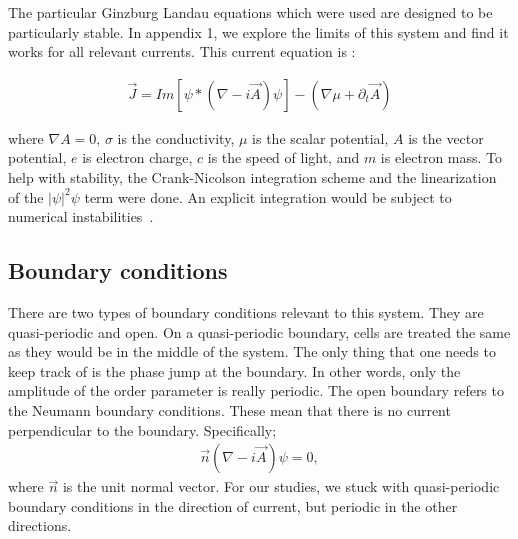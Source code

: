 The particular Ginzburg Landau equations which were used are designed to be particularly stable. In appendix 1, we explore the limits of this system and find it works for all relevant currents. This current equation is :

\begin{eqnarray}
\overrightarrow J = Im[\psi* (\nabla - i \overrightarrow A)\psi] - (\nabla \mu + \partial_t \overrightarrow A)
\label{currentEq}
\end{eqnarray}


where $\nabla A = 0$, $\sigma$ is the conductivity, $\mu$ is the scalar potential, $A$ is the vector potential, $e$ is electron charge, $c$ is the speed of light, and $m$ is electron mass. To help with stability, the Crank-Nicolson integration scheme and the linearization of the $|\psi|^2\psi$ term were done. An explicit integration would be subject to numerical instabilities~\cite{Sadovskyy14}.

\subsection{Boundary conditions}

There are two types of boundary conditions relevant to this system. They are quasi-periodic and open. On a quasi-periodic boundary, cells are treated the same as they would be in the middle of the system. The only thing that one needs to keep track of is the phase jump at the boundary. In other words, only the amplitude of the order parameter is really periodic. The open boundary refers to the Neumann boundary conditions. These mean that there is no current perpendicular to the boundary. Specifically;
\begin{eqnarray}
\overrightarrow n (\nabla - i \overrightarrow A)\psi = 0 ,
\label{nostuff}
\end{eqnarray}
where $\overrightarrow n$ is the unit normal vector. For our studies, we stuck with quasi-periodic boundary conditions in the direction of current, but periodic in the other directions.



